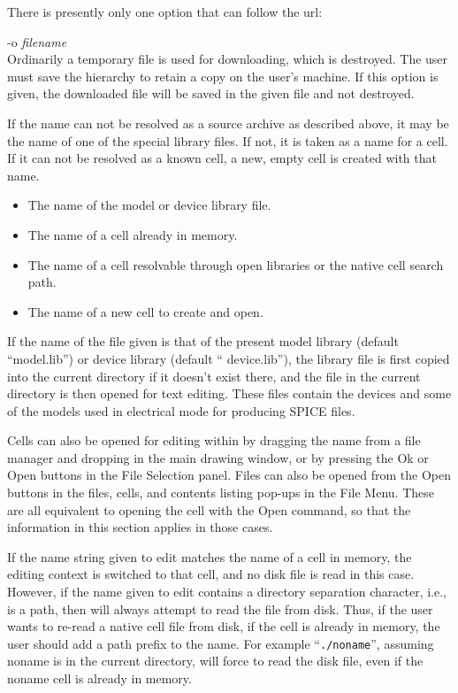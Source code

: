 There is presently only one option that can follow the url:
\begin{description}
\item{\vt -o {\it filename}}\\
Ordinarily a temporary file is used for downloading, which is
destroyed.  The user must save the hierarchy to retain a copy on the
user's machine.  If this option is given, the downloaded file will be
saved in the given file and not destroyed.
\end{description}

If the name can not be resolved as a source archive as described
above, it may be the name of one of the special library files.  If
not, it is taken as a name for a cell.  If it can not be resolved as a
known cell, a new, empty cell is created with that name.

\begin{itemize}
\item{The name of the model or device library file.}

\item{The name of a cell already in memory.}

\item{The name of a cell resolvable through open libraries or the
native cell search path.}

\item{The name of a new cell to create and open.}
\end{itemize}

If the name of the file given is that of the present model library
(default ``{\vt model.lib}'') or device library (default ``{\vt
device.lib}''), the library file is first copied into the current
directory if it doesn't exist there, and the file in the current
directory is then opened for text editing.  These files contain the
devices and some of the models used in electrical mode for producing
SPICE files.

Cells can also be opened for editing within {\Xic} by dragging the
name from a file manager and dropping in the main drawing window, or
by pressing the {\cb Ok} or {\cb Open} buttons in the {\cb File
Selection} panel.  Files can also be opened from the {\cb Open}
buttons in the files, cells, and contents listing pop-ups in the {\cb
File Menu}.  These are all equivalent to opening the cell with the
{\cb Open} command, so that the information in this section applies in
those cases.

If the name string given to edit matches the name of a cell in memory,
the editing context is switched to that cell, and no disk file is read
in this case.  However, if the name given to edit contains a directory
separation character, i.e., is a path, then {\Xic} will always attempt
to read the file from disk.  Thus, if the user wants to re-read a
native cell file from disk, if the cell is already in memory, the user
should add a path prefix to the name.  For example ``{\tt ./noname}'',
assuming {\vt noname} is in the current directory, will force {\Xic}
to read the disk file, even if the {\vt noname} cell is already in
memory.

